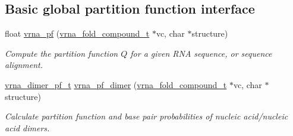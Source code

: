 \subsection*{Basic global partition function interface}
\begin{DoxyCompactItemize}
\item 
float \hyperlink{group__part__func__global_ga29e256d688ad221b78d37f427e0e99bc}{vrna\+\_\+pf} (\hyperlink{group__fold__compound_ga1b0cef17fd40466cef5968eaeeff6166}{vrna\+\_\+fold\+\_\+compound\+\_\+t} $\ast$vc, char $\ast$structure)
\begin{DoxyCompactList}\small\item\em Compute the partition function $Q$ for a given R\+NA sequence, or sequence alignment. \end{DoxyCompactList}\item 
\hyperlink{group__pf__cofold_ga444df1587c9a2ca15b8eb25188f629c3}{vrna\+\_\+dimer\+\_\+pf\+\_\+t} \hyperlink{group__part__func__global_ga4e5c7d06c302a7c59fc0d64dc142ca63}{vrna\+\_\+pf\+\_\+dimer} (\hyperlink{group__fold__compound_ga1b0cef17fd40466cef5968eaeeff6166}{vrna\+\_\+fold\+\_\+compound\+\_\+t} $\ast$vc, char $\ast$structure)
\begin{DoxyCompactList}\small\item\em Calculate partition function and base pair probabilities of nucleic acid/nucleic acid dimers. \end{DoxyCompactList}\end{DoxyCompactItemize}
